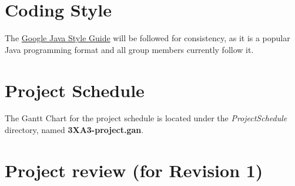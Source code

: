 \documentclass[12pt]{article}
\begin{document}
\section{Coding Style}
The \href{https://google.github.io/styleguide/javaguide.html}{Google Java Style Guide} will be followed for consistency, as it is a popular Java programming format and all group members currently follow it.

\section{Project Schedule}
The Gantt Chart for the project schedule is located under the \textit{ProjectSchedule} directory, named \textbf{3XA3-project.gan}.

\section{Project review (for Revision 1)}
\end{document}
